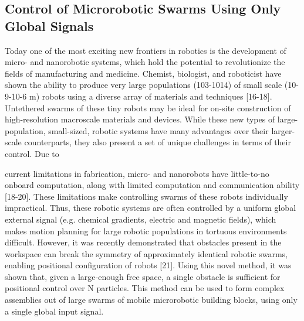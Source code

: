 \subsection{Control of Microrobotic Swarms Using Only Global Signals}
Today one of the most exciting new frontiers in robotics is the development of micro- and nanorobotic systems, which hold the potential to revolutionize the fields of manufacturing and medicine. Chemist, biologist, and roboticist have shown the ability to produce very large populations (103-1014) of small scale (10-9-10-6 m) robots using a diverse array of materials and techniques [16-18]. Untethered swarms of these tiny robots may be ideal for on-site construction of high-resolution macroscale materials and devices. While these new types of large-population, small-sized, robotic systems have many advantages over their larger-scale counterparts, they also present a set of unique challenges in terms of their control. Due to 

current limitations in fabrication, micro- and nanorobots have little-to-no onboard computation, along with limited computation and communication ability [18-20]. These limitations make controlling swarms of these robots individually impractical. Thus, these robotic systems are often controlled by a uniform global external signal (e.g. chemical gradients, electric and magnetic fields), which makes motion planning for large robotic populations in tortuous environments difficult. However, it was recently demonstrated that obstacles present in the workspace can break the symmetry of approximately identical robotic swarms, enabling positional configuration of robots [21]. Using this novel method, it was shown that, given a large-enough free space, a single obstacle is sufficient for positional control over N particles.  This method can be used to form complex assemblies out of large swarms of mobile microrobotic building blocks, using only a single global input signal.

